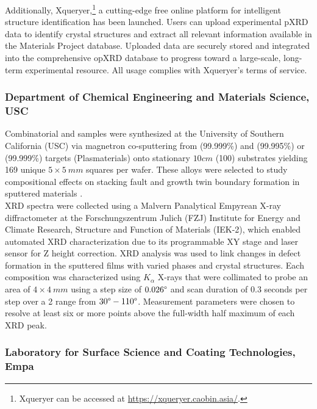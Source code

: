 Additionally, Xqueryer,\footnote{Xqueryer can be accessed at \url{https://xqueryer.caobin.asia/}.} a cutting-edge free online platform for intelligent structure identification has been launched. Users can upload experimental pXRD data to identify crystal structures and extract all relevant information available in the Materials Project database\cite{jain2013commentary}. Uploaded data are securely stored and integrated into the comprehensive opXRD database to progress toward a large-scale, long-term experimental resource. All usage complies with Xqueryer's terms of service.


\subsubsection*{Department of Chemical Engineering and Materials Science, USC}

Combinatorial  and  samples were synthesized at the University of Southern California (USC) via magnetron co-sputtering from  (99.999\%) and  (99.995\%) or  (99.999\%) targets (Plasmaterials) onto stationary $10 \si{cm}$  (100) substrates yielding 169 unique $5 \times 5 \ \si{mm}$ squares per wafer. These alloys were selected to study compositional effects on stacking fault and growth twin boundary formation in sputtered materials \cite{alwen2024_1,alwen2024_2}. \\

XRD spectra were collected using a Malvern Panalytical Empyrean X-ray diffractometer at the Forschungszentrum Julich (FZJ) Institute for Energy and Climate Research, Structure and Function of Materials (IEK-2), which enabled automated XRD characterization due to its programmable XY stage and laser sensor for Z height correction. XRD analysis was used to link changes in defect formation in the sputtered films with varied phases and crystal structures. Each composition was characterized using  $K_\alpha$ X-rays that were collimated to probe an area of $4 \times 4 \ \si{mm}$ using a step size of $0.026\degree$ and scan duration of $0.3$ seconds per step over a 2 range from $30\degree - 110\degree$. Measurement parameters were chosen to resolve at least six or more points above the full-width half maximum of each XRD peak.

\subsubsection*{Laboratory for Surface Science and Coating Technologies, Empa}

